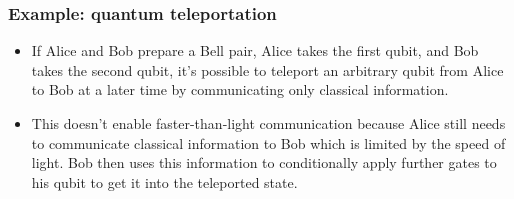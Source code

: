 \documentclass{article}
\begin{document}
\subsubsection{Example: quantum teleportation}

\begin{itemize}
  \item If Alice and Bob prepare a Bell pair, Alice takes the first qubit, and Bob takes the second qubit, it's possible to teleport an arbitrary qubit from Alice to Bob at a later time by communicating only classical information.

  \item This doesn't enable faster-than-light communication because Alice still needs to communicate classical information to Bob which is limited by the speed of light. Bob then uses this information to conditionally apply further gates to his qubit to get it into the teleported state.
\end{itemize}
\end{document}
